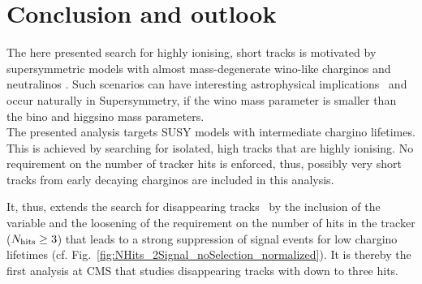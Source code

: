 
\FloatBarrier
\chapter{Conclusion and outlook}
\label{sec:Discussion}

The here presented search for highly ionising, short tracks is motivated by supersymmetric models with almost mass-degenerate wino-like charginos \chipm and neutralinos \chiO.
Such scenarios can have interesting astrophysical implications~\cite{bib:Moroi:DarkMatter_2013} and occur naturally in Supersymmetry, if the wino mass parameter is smaller than the bino and higgsino mass parameters.\\

The presented analysis targets SUSY models with intermediate chargino lifetimes. 
This is achieved by searching for isolated, high \pt tracks that are highly ionising.
No requirement on the number of tracker hits is enforced, thus, possibly very short tracks from early decaying charginos are included in this analysis.

It, thus, extends the search for disappearing tracks~\cite{bib:CMS:DT_8TeV} by the inclusion of the variable \dedx and the loosening of the requirement on the number of hits in the tracker ($N_{\text{hits}}\geq3$) that leads to a strong suppression of signal events for low chargino lifetimes (cf. Fig.~\ref{fig:NHits_2Signal_noSelection_normalized}).
It is thereby the first analysis at CMS that studies disappearing tracks with down to three hits.

